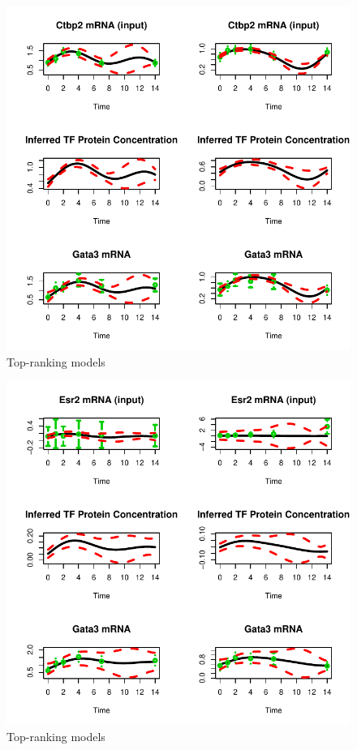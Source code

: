 \documentclass{article}
\begin{document}
\begin{figure}[htb]
  \centering
  \includegraphics[width=\columnwidth]{gpdisim_Ctbp2_Gata3}
  \caption{Top-ranking models}
  \label{fig:model3}
\end{figure}

\begin{figure}[htb]
  \centering
  \includegraphics[width=\columnwidth]{gpdisim_Esr2_Gata3}
  \caption{Top-ranking models}
  \label{fig:model4}
\end{figure}
\end{document}
